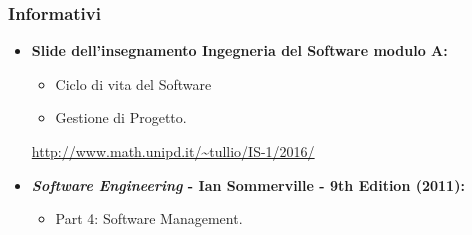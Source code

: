 \subsubsection{Informativi}
\begin{itemize}
	\item \textbf{Slide dell'insegnamento Ingegneria del Software modulo A:}
	\begin{itemize}
		\item Ciclo di vita del Software
		\item Gestione di Progetto.
	\end{itemize}
	\url{http://www.math.unipd.it/~tullio/IS-1/2016/}
	\item \textbf{\textit{Software Engineering} - Ian Sommerville - 9th Edition (2011):}
	\begin{itemize}
		\item Part 4: Software Management.
	\end{itemize} 
\end{itemize}